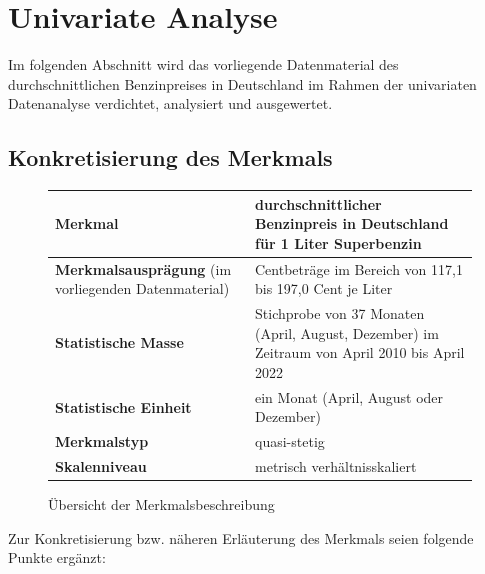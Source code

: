 \section{Univariate Analyse}
Im folgenden Abschnitt wird das vorliegende Datenmaterial des durchschnittlichen Benzinpreises in Deutschland im Rahmen der univariaten Datenanalyse verdichtet, analysiert und ausgewertet.\\

\subsection{Konkretisierung des Merkmals}
\begin{figure}[ht]
  \centering

  \begin{tabular}{| L{0.4\textwidth} | L{0.53\textwidth} |}
    \hline
    \textbf{Merkmal}                  & durchschnittlicher Benzinpreis in Deutschland für 1 Liter Superbenzin                         \\\hline
    \textbf{Merkmalsausprägung} \newline
    (im vorliegenden Datenmaterial)   & Centbeträge im Bereich von 117,1 bis 197,0 Cent je Liter                                      \\\hline
    \textbf{Statistische Masse}                & Stichprobe von 37 Monaten (April, August, Dezember) im Zeitraum von April 2010 bis April 2022 \\\hline
    \textbf{Statistische Einheit}              & ein Monat (April, August oder Dezember)                                                       \\\hline
    \textbf{Merkmalstyp}                       & quasi-stetig                                                                                  \\\hline
    \textbf{Skalenniveau}                      & metrisch verhältnisskaliert                                                                   \\
    \hline
  \end{tabular}
  \caption{Übersicht der Merkmalsbeschreibung}
  \label{tab:tabuebersichtuni}
\end{figure}

Zur Konkretisierung bzw. näheren Erläuterung des Merkmals seien folgende Punkte ergänzt:

